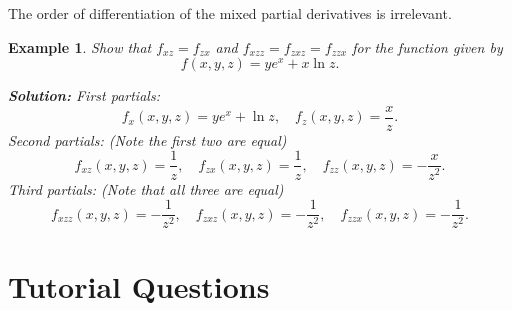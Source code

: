 \documentclass[titlepage,a4paper,12pt]{report}
\newtheorem{example}{Example}[section]
\begin{document}
\noindent The order of differentiation of the mixed partial derivatives is irrelevant. 
\begin{example}
Show that $f_{xz}=f_{zx}$ and $f_{xzz}=f_{zxz}=f_{zzx}$ for the function given by 
\[f(x,y,z)=ye^x+x\ln z.\]

\noindent \textbf{Solution:} First partials:
\[f_x(x,y,z)=ye^x+\ln z, \quad f_z(x,y,z)=\dfrac{x}{z}.\]
Second partials: (Note the first two are equal)
\[f_{xz}(x,y,z)=\dfrac{1}{z}, \quad f_{zx}(x,y,z)=\dfrac{1}{z}, \quad f_{zz}(x,y,z)=-\dfrac{x}{z^2}.\]
Third partials: (Note that all three are equal)
\[f_{xzz}(x,y,z)=-\dfrac{1}{z^2}, \quad f_{zxz}(x,y,z)=-\dfrac{1}{z^2}, \quad f_{zzx}(x,y,z)=-\dfrac{1}{z^2}.\]
\end{example}
\section{Tutorial Questions}
\end{document}
